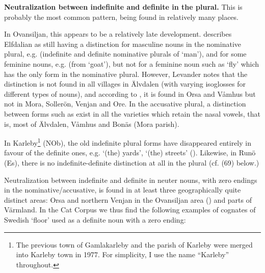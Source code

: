 
\textbf{Neutralization between indefinite and definite in the plural.} This is probably the most common pattern, being found in relatively many places. 


In Ovansiljan, this appears to be a relatively late development. \citet{Levander1909} describes Elfdalian as still having a distinction for masculine nouns in the nominative plural, e.g. (indefinite and definite nominative plurals of ‘man’), and for some feminine nouns, e.g.  (from  ‘goat’), but not for a feminine noun such as ‘fly’ which has the only form  in the nominative plural. However, Levander notes that the distinction is not found in all villages in Älvdalen (with varying isoglosses for different types of nouns), and according to \citet[170]{Levander1928}, it is found in Orsa and Våmhus but not in Mora, Sollerön, Venjan and Ore. In the accusative plural, a distinction between forms such as exist in all the varieties which retain the nasal vowels, that is, most of Älvdalen, Våmhus and Bonäs (Mora parish). 


In Karleby\footnote{ The previous town of Gamlakarleby and the parish of Karleby were merged into Karleby town in 1977. For simplicity, I use the name “Karleby” throughout. } (NOb), the old indefinite plural forms have disappeared entirely in favour of the definite ones, e.g.  ‘(the) yards’,  ‘(the) streets’ (\citet[93]{Hagfors1891}). Likewise, in Runö (Es), there is no indefinite-definite distinction at all in the plural (cf. (69) below.)


Neutralization between indefinite and definite in neuter nouns, with zero endings in the nominative/accusative, is found in at least three geographically quite distinct areas: Orsa and northern Venjan in the Ovansiljan area (\citet[133]{Levander1928}) and parts of Värmland. In the Cat Corpus we thus find the following examples of cognates of Swedish  ‘floor’ used as a definite noun with a zero ending:

